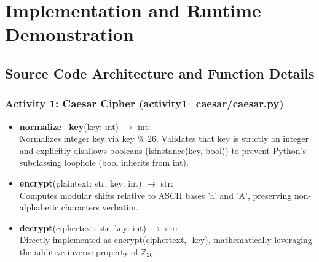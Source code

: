 \documentclass[12pt,a4paper]{report}
\renewcommand{\texttt}[1]{{\normalfont #1}}
\begin{document}
\clearpage

\chapter{Implementation and Runtime Demonstration}

\section{Source Code Architecture and Function Details}
\subsection{Activity 1: Caesar Cipher (\texttt{activity1\_caesar/\allowbreak caesar.py})}
\begin{itemize}[leftmargin=1.5em]
    \item \textbf{\texttt{normalize\_key}}(\texttt{key: int}) $\to$ \texttt{int}:\\[2pt]
    Normalizes integer key via \texttt{key \% 26}. Validates that \texttt{key} is strictly an integer and explicitly disallows booleans (\texttt{isinstance(key, bool)}) to prevent Python's subclassing loophole (\texttt{bool} inherits from \texttt{int}).
    \item \textbf{\texttt{encrypt}}(\texttt{plaintext: str, key: int}) $\to$ \texttt{str}:\\[2pt]
    Computes modular shifts relative to ASCII bases \texttt{'a'} and \texttt{'A'}, preserving non-alphabetic characters verbatim.
    \item \textbf{\texttt{decrypt}}(\texttt{ciphertext: str, key: int}) $\to$ \texttt{str}:\\[2pt]
    Directly implemented as \texttt{encrypt(ciphertext, -key)}, mathematically leveraging the additive inverse property of $\mathbb{Z}_{26}$.
\end{itemize}
\end{document}
